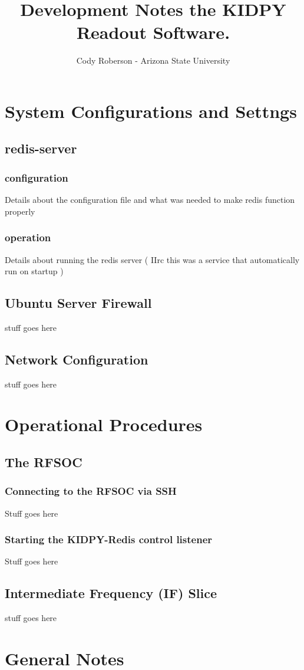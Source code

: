 \documentclass[11pt,letterpaper]{article}
\begin{document}
\title{Development Notes the KIDPY Readout Software.}
\author{Cody Roberson - Arizona State University}
\maketitle
\newpage
\tableofcontents
\newpage
\noindent
\section{System Configurations and Settngs}
\subsection{redis-server}
\subsubsection{configuration}
Details about the configuration file and what was needed to make redis function properly
\subsubsection{operation}
Details about running the redis server ( IIrc this was a service that automatically run on startup )
\subsection{Ubuntu Server Firewall}
stuff goes here
\subsection{Network Configuration}
stuff goes here


\newpage
\section{Operational Procedures}
\subsection{The RFSOC}
\subsubsection{Connecting to the RFSOC via SSH}
Stuff goes here
\subsubsection{Starting the KIDPY-Redis control listener}
Stuff goes here
\subsection{Intermediate Frequency (IF) Slice}
stuff goes here


\newpage
\section{General Notes}
\end{document}

